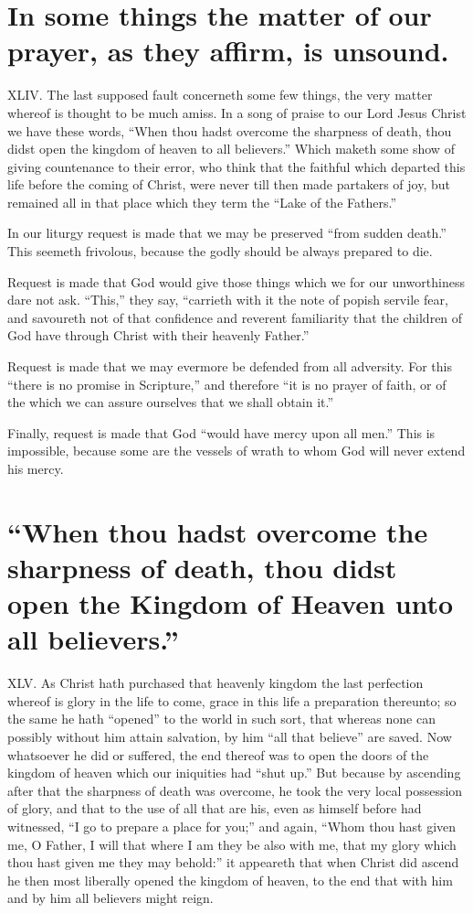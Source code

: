 \section*{In some things the matter of our prayer, as they affirm, is unsound.}
XLIV. The last supposed fault concerneth some few things, the very matter whereof is thought to be much amiss. In a song of praise to our Lord Jesus Christ we have these words, “When thou hadst overcome the sharpness of death, thou didst open the kingdom of heaven to all believers.” Which maketh some show of giving countenance to their  error, who think that the faithful which departed this life before the coming of Christ,
 were never till then made partakers of joy, but remained all in that place which they term the “Lake of the Fathers.”

In our liturgy request is made that we may be preserved “from sudden death.” This seemeth frivolous, because the godly should be always prepared to die.

Request is made that God would give those things which we for our unworthiness dare not ask. “This,” they say, “carrieth with it the note of popish servile fear, and savoureth not of that confidence and reverent familiarity that the children of God have through Christ with their heavenly Father.”

Request is made that we may evermore be defended from all adversity. For this “there is no promise in Scripture,” and therefore “it is no prayer of faith, or of the which we can assure ourselves that we shall obtain it.”

Finally, request is made that God “would have mercy upon all men.” This is impossible, because some are the vessels of wrath to whom God will never extend his mercy.


\section*{“When thou hadst overcome the sharpness of death, thou didst open the Kingdom of Heaven unto all believers.”}
XLV. As Christ hath purchased that heavenly kingdom the last perfection whereof is glory in the life to come, grace in this life a preparation thereunto; so the same he hath “opened” to the world in such sort, that whereas none can possibly without him attain salvation, by him “all that believe” are saved. Now whatsoever he did or suffered, the end thereof was to open the doors of the kingdom of heaven which our iniquities had “shut up.” But because by ascending  after that the sharpness of death was overcome, he took the very local possession of glory, and that to the use of all that are his, even as himself before had witnessed,
 “I go to prepare a place for you;” and again, “Whom thou hast given me, O Father, I will that where I am they be also with me, that my glory which thou hast given me they may behold:” it appeareth that when Christ did ascend he then most liberally opened the kingdom of heaven, to the end that with him and by him all believers might reign.

